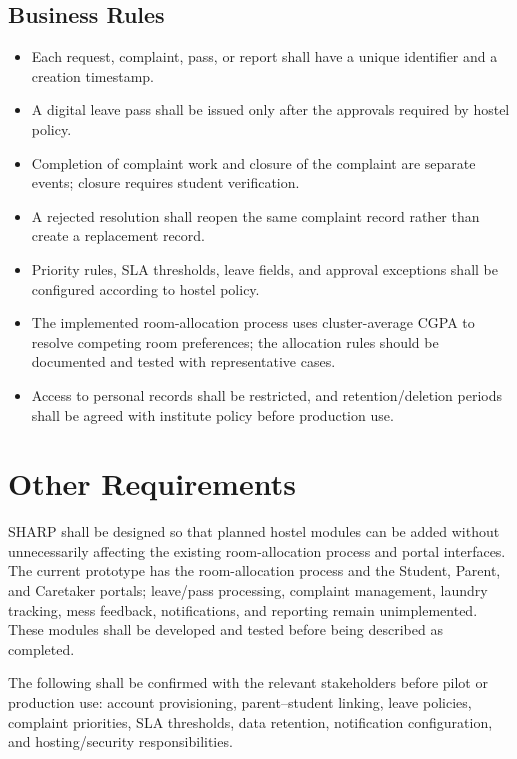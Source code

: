 \documentclass[11pt,a4paper]{article}
\numberwithin{figure}{section}   %
\begin{document}
\subsection{Business Rules}
\begin{itemize}
\item Each request, complaint, pass, or report shall have a unique identifier and a creation timestamp.
\item A digital leave pass shall be issued only after the approvals required by hostel policy.
\item Completion of complaint work and closure of the complaint are separate events; closure requires student verification.
\item A rejected resolution shall reopen the same complaint record rather than create a replacement record.
\item Priority rules, SLA thresholds, leave fields, and approval exceptions shall be configured according to hostel policy.
\item The implemented room-allocation process uses cluster-average CGPA to resolve competing room preferences; the allocation rules should be documented and tested with representative cases.
\item Access to personal records shall be restricted, and retention/deletion periods shall be agreed with institute policy before production use.
\end{itemize}

\section{Other Requirements}
SHARP shall be designed so that planned hostel modules can be added without unnecessarily affecting the existing room-allocation process and portal interfaces. The current prototype has the room-allocation process and the Student, Parent, and Caretaker portals; leave/pass processing, complaint management, laundry tracking, mess feedback, notifications, and reporting remain unimplemented. These modules shall be developed and tested before being described as completed.

The following shall be confirmed with the relevant stakeholders before pilot or production use: account provisioning, parent--student linking, leave policies, complaint priorities, SLA thresholds, data retention, notification configuration, and hosting/security responsibilities.
\end{document}
